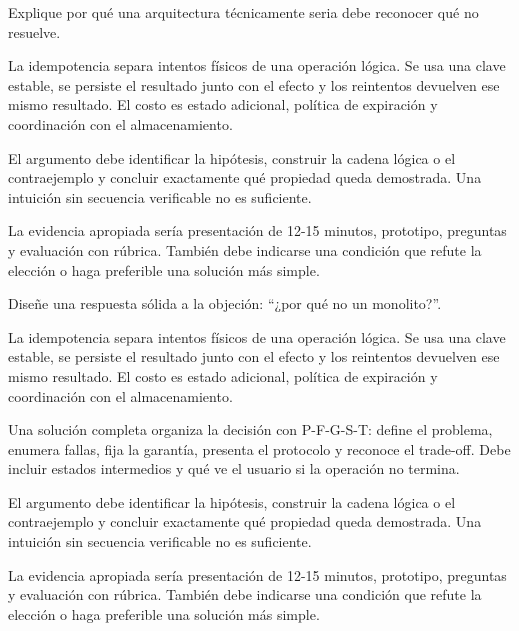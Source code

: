 \documentclass[variant=guia,cover=institutional,mode=screen]{ua-engineering-v6-article}
\begin{document}
\begin{uaexercise}
Explique por qué una arquitectura técnicamente seria debe reconocer qué no resuelve.
\end{uaexercise}
\begin{uaanswer}
La idempotencia separa intentos físicos de una operación lógica. Se usa una clave estable, se persiste el resultado junto con el efecto y los reintentos devuelven ese mismo resultado. El costo es estado adicional, política de expiración y coordinación con el almacenamiento.

El argumento debe identificar la hipótesis, construir la cadena lógica o el contraejemplo y concluir exactamente qué propiedad queda demostrada. Una intuición sin secuencia verificable no es suficiente.

La evidencia apropiada sería presentación de 12-15 minutos, prototipo, preguntas y evaluación con rúbrica. También debe indicarse una condición que refute la elección o haga preferible una solución más simple.
\end{uaanswer}

\begin{uaexercise}
Diseñe una respuesta sólida a la objeción: “¿por qué no un monolito?”.
\end{uaexercise}
\begin{uaanswer}
La idempotencia separa intentos físicos de una operación lógica. Se usa una clave estable, se persiste el resultado junto con el efecto y los reintentos devuelven ese mismo resultado. El costo es estado adicional, política de expiración y coordinación con el almacenamiento.

Una solución completa organiza la decisión con P-F-G-S-T: define el problema, enumera fallas, fija la garantía, presenta el protocolo y reconoce el trade-off. Debe incluir estados intermedios y qué ve el usuario si la operación no termina.

El argumento debe identificar la hipótesis, construir la cadena lógica o el contraejemplo y concluir exactamente qué propiedad queda demostrada. Una intuición sin secuencia verificable no es suficiente.

La evidencia apropiada sería presentación de 12-15 minutos, prototipo, preguntas y evaluación con rúbrica. También debe indicarse una condición que refute la elección o haga preferible una solución más simple.
\end{uaanswer}
\end{document}
